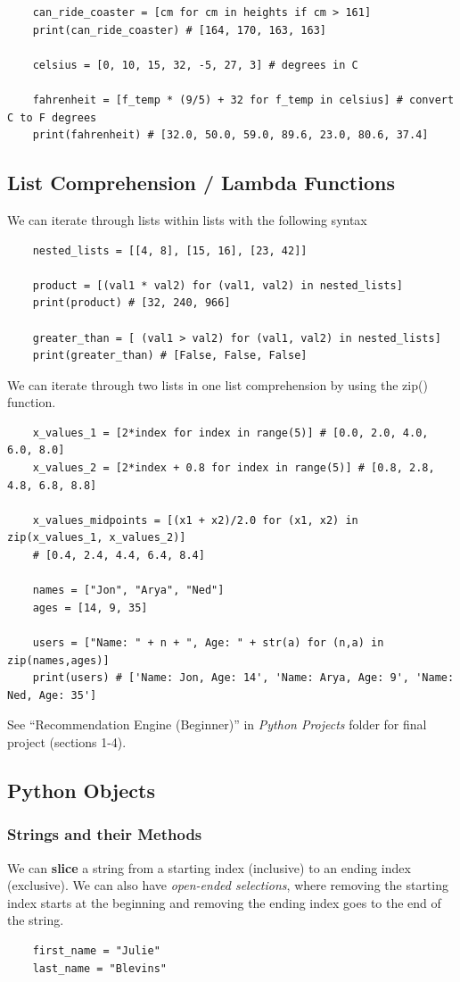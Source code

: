 \documentclass[11pt, a4paper]{article}
\begin{document}
\begin{spacing}{1.1}
\begin{lstlisting}
	can_ride_coaster = [cm for cm in heights if cm > 161]
	print(can_ride_coaster) # [164, 170, 163, 163] 
	
	celsius = [0, 10, 15, 32, -5, 27, 3] # degrees in C
	
	fahrenheit = [f_temp * (9/5) + 32 for f_temp in celsius] # convert C to F degrees
	print(fahrenheit) # [32.0, 50.0, 59.0, 89.6, 23.0, 80.6, 37.4] \end{lstlisting}\vspace*{4mm}	
	\subsection{List Comprehension / Lambda Functions}
	We can iterate through lists within lists with the following syntax
	\begin{lstlisting}
	nested_lists = [[4, 8], [15, 16], [23, 42]]
	
	product = [(val1 * val2) for (val1, val2) in nested_lists]
	print(product) # [32, 240, 966]	
	
	greater_than = [ (val1 > val2) for (val1, val2) in nested_lists]
	print(greater_than) # [False, False, False] \end{lstlisting}\vspace*{1mm}
	We can iterate through two lists in one list comprehension by using the zip() function.
	\begin{lstlisting}
	x_values_1 = [2*index for index in range(5)] # [0.0, 2.0, 4.0, 6.0, 8.0] 
	x_values_2 = [2*index + 0.8 for index in range(5)] # [0.8, 2.8, 4.8, 6.8, 8.8] 
	
	x_values_midpoints = [(x1 + x2)/2.0 for (x1, x2) in zip(x_values_1, x_values_2)]
	# [0.4, 2.4, 4.4, 6.4, 8.4]	
	
	names = ["Jon", "Arya", "Ned"]
	ages = [14, 9, 35]
	
	users = ["Name: " + n + ", Age: " + str(a) for (n,a) in zip(names,ages)]
	print(users) # ['Name: Jon, Age: 14', 'Name: Arya, Age: 9', 'Name: Ned, Age: 35'] \end{lstlisting} \vspace*{2mm}
	See ``Recommendation Engine (Beginner)'' in \textit{Python Projects} folder for final project (sections 1-4).\vspace*{4mm}
	
	\subsection{Python Objects}
	\subsubsection{Strings and their Methods}
	We can \textbf{slice} a string from a starting index (inclusive) to an ending index (exclusive). We can also have \textit{open-ended selections}, where removing the starting index starts at the beginning and removing the ending index goes to the end of the string.
	\begin{lstlisting}
	first_name = "Julie"
	last_name = "Blevins"
	

\end{lstlisting}
\end{spacing}
\end{document}
